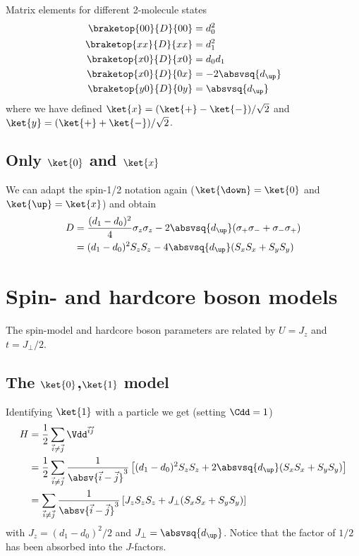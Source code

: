 Matrix elements for different 2-molecule states
\begin{align*}
\braketop{00}{D}{00} &= d_0^2 \\
\braketop{xx}{D}{xx} &= d_1^2 \\
\braketop{x0}{D}{x0} &= d_0 d_1 \\
\braketop{x0}{D}{0x} &= -2 \absvsq{d_\up}\\
\braketop{y0}{D}{0y} &= \absvsq{d_\up}
\end{align*}
where we have defined $\ket{x} = (\ket{+}-\ket{-})/\sqrt{2}$ and  $\ket{y} = (\ket{+}+\ket{-})/\sqrt{2}$.

\subsection{Only $\ket{0}$ and $\ket{x}$}
We can adapt the spin-1/2 notation again ($\ket{\down}=\ket{0}$ and $\ket{\up}=\ket{x}$) and obtain
\begin{align*}
D&=\frac{(d_1-d_0)^2}{4} \sigma_z \sigma_z -2 \absvsq{d_\up} (\sigma_+ \sigma_- + \sigma_-\sigma_+)\\
&=(d_1-d_0)^2 S_z S_z - 4\absvsq{d_\up} (S_x S_x + S_y S_y)
\end{align*}


\section{Spin- and hardcore boson models}
The spin-model and hardcore boson parameters are related by $U=J_z$ and $t=J_\perp/2$.

\subsection{The $\ket{0}$,$\ket{1}$ model}
Identifying $\ket{1}$ with a particle we get (setting $\Cdd=1$)
\begin{align*}
H&=\frac{1}{2}\sum_{\vec{i}\ne \vec{j}} \Vdd^{\vec{i}\vec{j}}\\
&=\frac{1}{2}\sum_{\vec{i}\ne \vec{j}} \frac{1}{\absv{\vec{i}-\vec{j}}^3}\left[ (d_1-d_0)^2 S_z S_z + 2\absvsq{d_{\up}} (S_x S_x + S_y S_y) \right]\\
&= \sum_{\vec{i}\ne \vec{j}} \frac{1}{\absv{\vec{i}-\vec{j}}^3}\left[ J_z S_z S_z + J_\perp (S_x S_x + S_y S_y) \right]
\end{align*}
with $J_z = (d_1-d_0)^2/2$ and $J_\perp = \absvsq{d_{\up}}$. Notice that the factor of $1/2$ has been absorbed into the $J$-factors.

